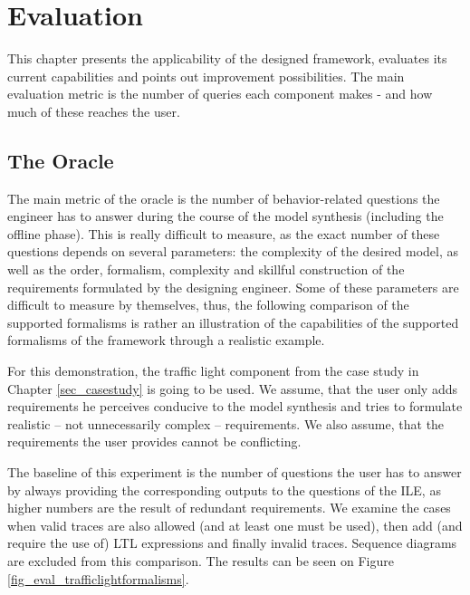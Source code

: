 \chapter{Evaluation}
This chapter presents the applicability of the designed framework, evaluates its current capabilities and points out improvement possibilities. The main evaluation metric is the number of queries each component makes - and how much of these reaches the user.

\section{The Oracle} \label{subs_evaloracle}
The main metric of the oracle is the number of behavior-related questions the engineer has to answer during the course of the model synthesis (including the offline phase). This is really difficult to measure, as the exact number of these questions depends on several parameters: the complexity of the desired model, as well as the order, formalism, complexity and skillful construction of the requirements formulated by the designing engineer. Some of these parameters are difficult to measure by themselves, thus, the following comparison of the supported formalisms is rather an illustration of the capabilities of the supported formalisms of the framework through a realistic example. 

For this demonstration, the traffic light component from the case study in Chapter \ref{sec_casestudy} is going to be used. We assume, that the user only adds requirements he perceives conducive to the model synthesis and tries to formulate realistic -- not unnecessarily complex -- requirements. We also assume, that the requirements the user provides cannot be conflicting.

The baseline of this experiment is the number of questions the user has to answer by always providing the corresponding outputs to the questions of the ILE, as higher numbers are the result of redundant requirements. We examine the cases when valid traces are also allowed (and at least one must be used), then add (and require the use of) LTL expressions and finally invalid traces. Sequence diagrams are excluded from this comparison. The results can be seen on Figure \ref{fig_eval_trafficlightformalisms}.

